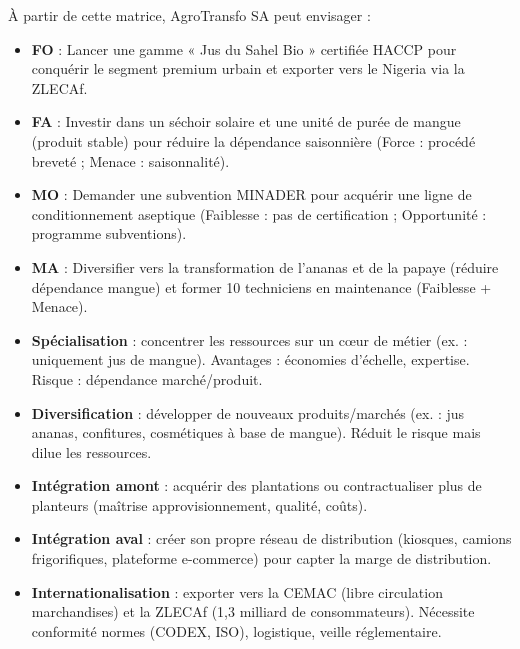\documentclass[11pt]{article}
\begin{document}
À partir de cette matrice, AgroTransfo SA peut envisager :

\begin{itemize}
    \item \textbf{FO} : Lancer une gamme « Jus du Sahel Bio » certifiée HACCP pour conquérir le segment premium urbain et exporter vers le Nigeria via la ZLECAf.
    \item \textbf{FA} : Investir dans un séchoir solaire et une unité de purée de mangue (produit stable) pour réduire la dépendance saisonnière (Force : procédé breveté ; Menace : saisonnalité).
    \item \textbf{MO} : Demander une subvention MINADER pour acquérir une ligne de conditionnement aseptique (Faiblesse : pas de certification ; Opportunité : programme subventions).
    \item \textbf{MA} : Diversifier vers la transformation de l'ananas et de la papaye (réduire dépendance mangue) et former 10 techniciens en maintenance (Faiblesse + Menace).
\end{itemize}

\begin{aretenir}
\begin{itemize}
    \item \textbf{Spécialisation} : concentrer les ressources sur un cœur de métier (ex. : uniquement jus de mangue). Avantages : économies d'échelle, expertise. Risque : dépendance marché/produit.
    \item \textbf{Diversification} : développer de nouveaux produits/marchés (ex. : jus ananas, confitures, cosmétiques à base de mangue). Réduit le risque mais dilue les ressources.
    \item \textbf{Intégration amont} : acquérir des plantations ou contractualiser plus de planteurs (maîtrise approvisionnement, qualité, coûts).
    \item \textbf{Intégration aval} : créer son propre réseau de distribution (kiosques, camions frigorifiques, plateforme e-commerce) pour capter la marge de distribution.
    \item \textbf{Internationalisation} : exporter vers la CEMAC (libre circulation marchandises) et la ZLECAf (1,3 milliard de consommateurs). Nécessite conformité normes (CODEX, ISO), logistique, veille réglementaire.
\end{itemize}
\end{aretenir}
\end{document}
